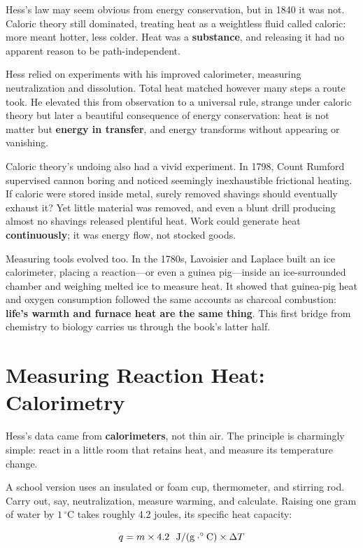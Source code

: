 \begin{zhengju}
Hess's law may seem obvious from energy conservation, but in 1840 it was not. Caloric theory still dominated, treating heat as a weightless fluid called caloric: more meant hotter, less colder. Heat was a \textbf{substance}, and releasing it had no apparent reason to be path-independent.

Hess relied on experiments with his improved calorimeter, measuring neutralization and dissolution. Total heat matched however many steps a route took. He elevated this from observation to a universal rule, strange under caloric theory but later a beautiful consequence of energy conservation: heat is not matter but \textbf{energy in transfer}, and energy transforms without appearing or vanishing.

Caloric theory's undoing also had a vivid experiment. In 1798, Count Rumford supervised cannon boring and noticed seemingly inexhaustible frictional heating. If caloric were stored inside metal, surely removed shavings should eventually exhaust it? Yet little material was removed, and even a blunt drill producing almost no shavings released plentiful heat. Work could generate heat \textbf{continuously}; it was energy flow, not stocked goods.

Measuring tools evolved too. In the 1780s, Lavoisier and Laplace built an ice calorimeter, placing a reaction---or even a guinea pig---inside an ice-surrounded chamber and weighing melted ice to measure heat. It showed that guinea-pig heat and oxygen consumption followed the same accounts as charcoal combustion: \textbf{life's warmth and furnace heat are the same thing}. This first bridge from chemistry to biology carries us through the book's latter half.
\end{zhengju}
\section{Measuring Reaction Heat: Calorimetry}

Hess's data came from \textbf{calorimeters}, not thin air. The principle is charmingly simple: react in a little room that retains heat, and measure its temperature change.

A school version uses an insulated or foam cup, thermometer, and stirring rod. Carry out, say, neutralization, measure warming, and calculate. Raising one gram of water by $1\,^{\circ}\mathrm{C}$ takes roughly 4.2 joules, its specific heat capacity:

\[ q = m \times 4.2\ \ \mathrm{J/(g\cdot ^{\circ}C)} \times \Delta T \]

